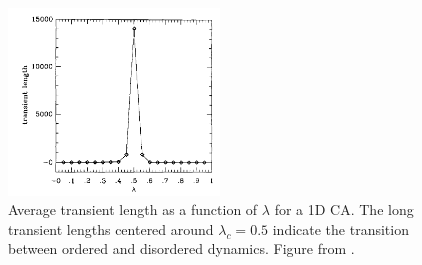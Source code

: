\documentclass[a4paper,11pt]{article}
\begin{document}
\begin{figure}[htp]
\centering
\includegraphics[width=0.5\textwidth]{la90_fig3_lambda_transient_len.png}
\caption[Lambda and Transient Length]{
Average transient length as a function of $\lambda$ for a 1D CA. The long transient lengths centered around $\lambda_c=0.5$ indicate the transition between ordered and disordered dynamics. Figure from \citeauthor{la90} \cite{la90}.
}
\label{fig:lambda_trans}
\end{figure}


\end{document}
